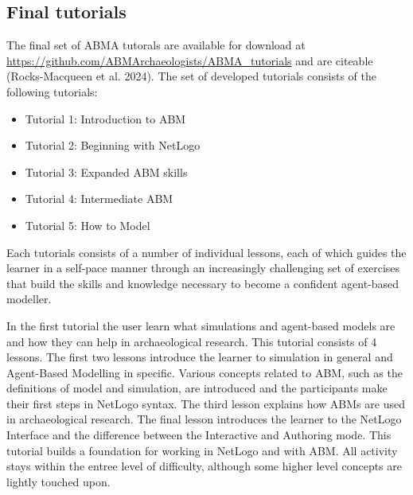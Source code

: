 \documentclass[
]{article}
\begin{document}
\hypertarget{final-tutorials}{%
\subsection{Final tutorials}\label{final-tutorials}}

The final set of ABMA tutorals are available for download at \url{https://github.com/ABMArchaeologists/ABMA_tutorials} and are citeable (Rocks-Macqueen et al. 2024). The set of developed tutorials consists of the following tutorials:

\begin{itemize}
\item
  Tutorial 1: Introduction to ABM
\item
  Tutorial 2: Beginning with NetLogo
\item
  Tutorial 3: Expanded ABM skills
\item
  Tutorial 4: Intermediate ABM
\item
  Tutorial 5: How to Model
\end{itemize}

Each tutorials consists of a number of individual lessons, each of which guides the learner in a self-pace manner through an increasingly challenging set of exercises that build the skills and knowledge necessary to become a confident agent-based modeller.

In the first tutorial the user learn what simulations and agent-based models are and how they can help in archaeological research. This tutorial consists of 4 lessons. The first two lessons introduce the learner to simulation in general and Agent-Based Modelling in specific. Various concepts related to ABM, such as the definitions of model and simulation, are introduced and the participants make their first steps in NetLogo syntax. The third lesson explains how ABMs are used in archaeological research. The final lesson introduces the learner to the NetLogo Interface and the difference between the Interactive and Authoring mode. This tutorial builds a foundation for working in NetLogo and with ABM. All activity stays within the entree level of difficulty, although some higher level concepts are lightly touched upon.
\end{document}
